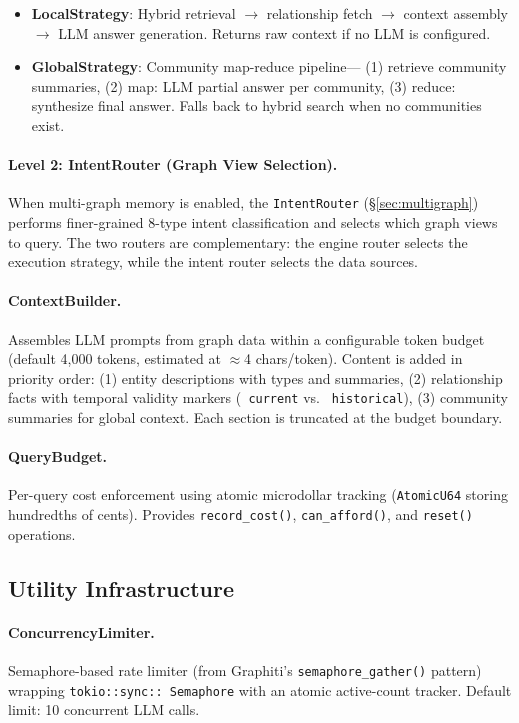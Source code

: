 \documentclass[11pt,a4paper,twocolumn]{article}
\begin{document}
\begin{itemize}[leftmargin=*]
  \item \textbf{LocalStrategy}: Hybrid retrieval $\to$ relationship
    fetch $\to$ context assembly $\to$ LLM answer generation.
    Returns raw context if no LLM is configured.
  \item \textbf{GlobalStrategy}: Community map-reduce pipeline---
    (1) retrieve community summaries, (2) map: LLM partial answer
    per community, (3) reduce: synthesize final answer. Falls back
    to hybrid search when no communities exist.
\end{itemize}

\paragraph{Level 2: IntentRouter (Graph View Selection).}
When multi-graph memory is enabled, the \texttt{IntentRouter}
(\S\ref{sec:multigraph}) performs finer-grained 8-type intent
classification and selects which graph views to query. The two
routers are complementary: the engine router selects the execution
strategy, while the intent router selects the data sources.

\paragraph{ContextBuilder.}
Assembles LLM prompts from graph data within a configurable token
budget (default 4,000 tokens, estimated at $\approx$4
chars/token). Content is added in priority order: (1) entity
descriptions with types and summaries, (2) relationship facts
with temporal validity markers (\texttt{\checkmark~current} vs.
\texttt{\texttimes~historical}), (3) community summaries for
global context. Each section is truncated at the budget boundary.

\paragraph{QueryBudget.}
Per-query cost enforcement using atomic microdollar tracking
(\texttt{AtomicU64} storing hundredths of cents). Provides
\texttt{record\_cost()}, \texttt{can\_afford()}, and \texttt{reset()}
operations.

\subsection{Utility Infrastructure}
\label{sec:utils}

\paragraph{ConcurrencyLimiter.}
Semaphore-based rate limiter (from Graphiti's
\texttt{semaphore\_gather()} pattern) wrapping \texttt{tokio::sync::%
Semaphore} with an atomic active-count tracker. Default limit: 10
concurrent LLM calls.
\end{document}
